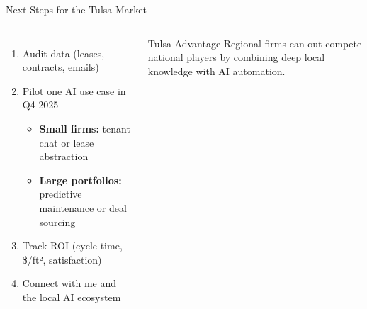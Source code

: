 \documentclass{beamer}
\begin{document}
\begin{frame}{Next Steps for the Tulsa Market}
  \footnotesize
  \begin{columns}[t,onlytextwidth]
      \begin{enumerate}
        \item Audit data (leases, contracts, emails)
        \item Pilot one AI use case in Q4 2025
          \begin{itemize}\scriptsize
            \item \textbf{Small firms:} tenant chat or lease abstraction
            \item \textbf{Large portfolios:} predictive maintenance or deal sourcing
          \end{itemize}
        \item Track ROI (cycle time, \$/ft², satisfaction)
        \item Connect with me and the local AI ecosystem
      \end{enumerate}

      \begin{block}{Tulsa Advantage}\scriptsize
        Regional firms can out-compete national players by combining deep local
        knowledge with AI automation.
      \end{block}
  \end{columns}

  \vfill
  \setlength{\fboxsep}{0pt}%
  \setlength{\fboxrule}{1pt}%
  \begin{center}
  \end{center}
\end{frame}




\end{document}
